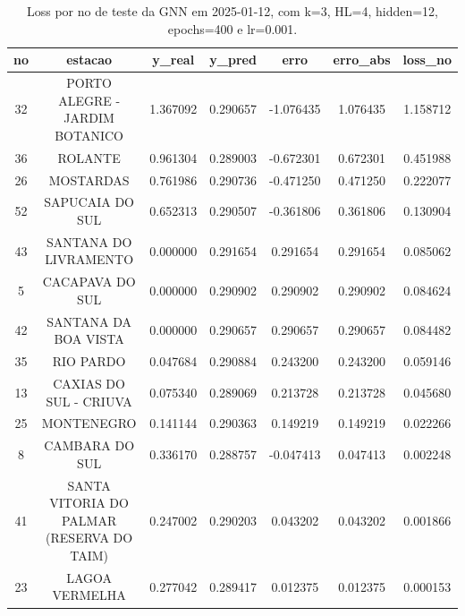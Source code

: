 \begin{table}[h]
\centering
\caption{Loss por no de teste da GNN em 2025-01-12, com k=3, HL=4, hidden=12, epochs=400 e lr=0.001.}
\label{tab:gnn_loss_k3_hl4_h12_e400_d20250112}
\begin{tabular}{ccccccc}
\toprule
no & estacao & y\_real & y\_pred & erro & erro\_abs & loss\_no \\
\midrule
32 & PORTO ALEGRE - JARDIM BOTANICO & 1.367092 & 0.290657 & -1.076435 & 1.076435 & 1.158712 \\
36 & ROLANTE & 0.961304 & 0.289003 & -0.672301 & 0.672301 & 0.451988 \\
26 & MOSTARDAS & 0.761986 & 0.290736 & -0.471250 & 0.471250 & 0.222077 \\
52 & SAPUCAIA DO SUL & 0.652313 & 0.290507 & -0.361806 & 0.361806 & 0.130904 \\
43 & SANTANA DO LIVRAMENTO & 0.000000 & 0.291654 & 0.291654 & 0.291654 & 0.085062 \\
5 & CACAPAVA DO SUL & 0.000000 & 0.290902 & 0.290902 & 0.290902 & 0.084624 \\
42 & SANTANA DA BOA VISTA & 0.000000 & 0.290657 & 0.290657 & 0.290657 & 0.084482 \\
35 & RIO PARDO & 0.047684 & 0.290884 & 0.243200 & 0.243200 & 0.059146 \\
13 & CAXIAS DO SUL - CRIUVA & 0.075340 & 0.289069 & 0.213728 & 0.213728 & 0.045680 \\
25 & MONTENEGRO & 0.141144 & 0.290363 & 0.149219 & 0.149219 & 0.022266 \\
8 & CAMBARA DO SUL & 0.336170 & 0.288757 & -0.047413 & 0.047413 & 0.002248 \\
41 & SANTA VITORIA DO PALMAR (RESERVA DO TAIM) & 0.247002 & 0.290203 & 0.043202 & 0.043202 & 0.001866 \\
23 & LAGOA VERMELHA & 0.277042 & 0.289417 & 0.012375 & 0.012375 & 0.000153 \\
\bottomrule
\end{tabular}
\end{table}
